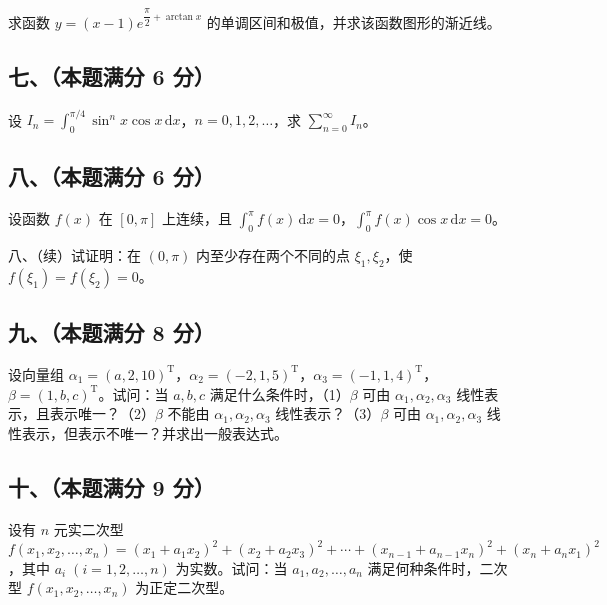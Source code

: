 \documentclass[UTF8,12pt]{ctexart}
\begin{document}
求函数 \(\displaystyle y=(x-1)e^{\dfrac{\displaystyle \pi}{\displaystyle 2}+\arctan x}\) 的单调区间和极值，并求该函数图形的渐近线。


\subsection*{七、（本题满分 6 分）}

设 \(\displaystyle I_n=\displaystyle \int_0^{\pi/4}\sin^n x\cos x\,\mathrm dx\)，\(\displaystyle n=0,\allowbreak 1,\allowbreak 2,\allowbreak \ldots\)，求 \(\displaystyle \sum_{n=0}^{\infty}I_n\)。


\subsection*{八、（本题满分 6 分）}

设函数 \(\displaystyle f(x)\) 在 \(\displaystyle [0,\allowbreak \pi]\) 上连续，且 \(\displaystyle \int_0^\pi f(x)\,\mathrm dx=0\)，\(\displaystyle \int_0^\pi f(x)\cos x\,\mathrm dx=0\)。


八、（续）试证明：在 \(\displaystyle (0,\allowbreak \pi)\) 内至少存在两个不同的点 \(\displaystyle \xi_1,\allowbreak \xi_2\)，使 \(\displaystyle f(\xi_1)=f(\xi_2)=0\)。


\subsection*{九、（本题满分 8 分）}

设向量组 \(\displaystyle \alpha_1=(a,\allowbreak 2,\allowbreak 10)^{\mathrm T}\)，\(\displaystyle \alpha_2=(-2,\allowbreak 1,\allowbreak 5)^{\mathrm T}\)，\(\displaystyle \alpha_3=(-1,\allowbreak 1,\allowbreak 4)^{\mathrm T}\)，\(\displaystyle \beta=(1,\allowbreak b,\allowbreak c)^{\mathrm T}\)。试问：当 \(\displaystyle a,\allowbreak b,\allowbreak c\) 满足什么条件时，（1）\(\displaystyle \beta\) 可由 \(\displaystyle \alpha_1,\allowbreak \alpha_2,\allowbreak \alpha_3\) 线性表示，且表示唯一？（2）\(\displaystyle \beta\) 不能由 \(\displaystyle \alpha_1,\allowbreak \alpha_2,\allowbreak \alpha_3\) 线性表示？（3）\(\displaystyle \beta\) 可由 \(\displaystyle \alpha_1,\allowbreak \alpha_2,\allowbreak \alpha_3\) 线性表示，但表示不唯一？并求出一般表达式。


\subsection*{十、（本题满分 9 分）}

设有 \(\displaystyle n\) 元实二次型 \(\displaystyle f(x_1,\allowbreak x_2,\allowbreak \ldots,\allowbreak x_n)=(x_1+a_1x_2)^2+(x_2+a_2x_3)^2+\cdots+(x_{n-1}+a_{n-1}x_n)^2+(x_n+a_nx_1)^2\)，其中 \(\displaystyle a_i\;(i=1,\allowbreak 2,\allowbreak \ldots,\allowbreak n)\) 为实数。试问：当 \(\displaystyle a_1,\allowbreak a_2,\allowbreak \ldots,\allowbreak a_n\) 满足何种条件时，二次型 \(\displaystyle f(x_1,\allowbreak x_2,\allowbreak \ldots,\allowbreak x_n)\) 为正定二次型。
\end{document}

